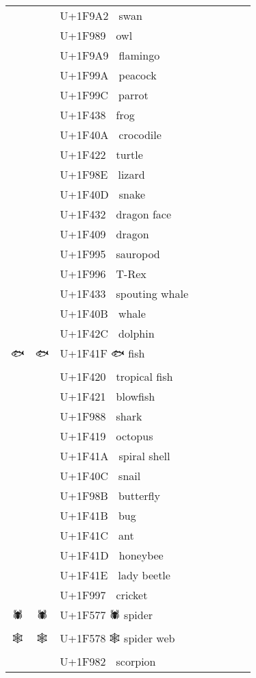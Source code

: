 \documentclass[a4paper,12pt]{article}
\newcommand{\fontA}[1]{{\fontspec[RawFeature={mode=harf,+dist,+ccmp}]{Segoe UI Emoji} #1}}
\newcommand{\fontB}[1]{{\fontspec[RawFeature={mode=harf,+dist,+ccmp}]{Noto Color Emoji} #1}}
\begin{document}
\begin{longtable}[c]{ccp{0.8\linewidth}}
\fontA{🦢}&\fontB{🦢}&U+1F9A2 🦢 swan\\
\fontA{🦉}&\fontB{🦉}&U+1F989 🦉 owl\\
\fontA{🦩}&\fontB{🦩}&U+1F9A9 🦩 flamingo\\
\fontA{🦚}&\fontB{🦚}&U+1F99A 🦚 peacock\\
\fontA{🦜}&\fontB{🦜}&U+1F99C 🦜 parrot\\
\fontA{🐸}&\fontB{🐸}&U+1F438 🐸 frog\\
\fontA{🐊}&\fontB{🐊}&U+1F40A 🐊 crocodile\\
\fontA{🐢}&\fontB{🐢}&U+1F422 🐢 turtle\\
\fontA{🦎}&\fontB{🦎}&U+1F98E 🦎 lizard\\
\fontA{🐍}&\fontB{🐍}&U+1F40D 🐍 snake\\
\fontA{🐲}&\fontB{🐲}&U+1F432 🐲 dragon face\\
\fontA{🐉}&\fontB{🐉}&U+1F409 🐉 dragon\\
\fontA{🦕}&\fontB{🦕}&U+1F995 🦕 sauropod\\
\fontA{🦖}&\fontB{🦖}&U+1F996 🦖 T-Rex\\
\fontA{🐳}&\fontB{🐳}&U+1F433 🐳 spouting whale\\
\fontA{🐋}&\fontB{🐋}&U+1F40B 🐋 whale\\
\fontA{🐬}&\fontB{🐬}&U+1F42C 🐬 dolphin\\
\fontA{🐟}&\fontB{🐟}&U+1F41F 🐟 fish\\
\fontA{🐠}&\fontB{🐠}&U+1F420 🐠 tropical fish\\
\fontA{🐡}&\fontB{🐡}&U+1F421 🐡 blowfish\\
\fontA{🦈}&\fontB{🦈}&U+1F988 🦈 shark\\
\fontA{🐙}&\fontB{🐙}&U+1F419 🐙 octopus\\
\fontA{🐚}&\fontB{🐚}&U+1F41A 🐚 spiral shell\\
\fontA{🐌}&\fontB{🐌}&U+1F40C 🐌 snail\\
\fontA{🦋}&\fontB{🦋}&U+1F98B 🦋 butterfly\\
\fontA{🐛}&\fontB{🐛}&U+1F41B 🐛 bug\\
\fontA{🐜}&\fontB{🐜}&U+1F41C 🐜 ant\\
\fontA{🐝}&\fontB{🐝}&U+1F41D 🐝 honeybee\\
\fontA{🐞}&\fontB{🐞}&U+1F41E 🐞 lady beetle\\
\fontA{🦗}&\fontB{🦗}&U+1F997 🦗 cricket\\
\fontA{🕷}&\fontB{🕷}&U+1F577 🕷 spider\\
\fontA{🕸}&\fontB{🕸}&U+1F578 🕸 spider web\\
\fontA{🦂}&\fontB{🦂}&U+1F982 🦂 scorpion\\

\end{longtable}
\end{document}
